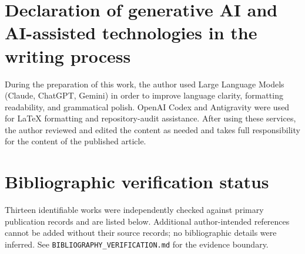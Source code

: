 \documentclass[preprint,12pt]{elsarticle}
\begin{document}
\section*{Declaration of generative AI and AI-assisted technologies in the writing process}\label{declaration-of-generative-ai}

During the preparation of this work, the author used Large Language Models (Claude, ChatGPT, Gemini) in order to improve language clarity, formatting readability, and grammatical polish. OpenAI Codex and Antigravity were used for LaTeX formatting and repository-audit assistance. After using these services, the author reviewed and edited the content as needed and takes full responsibility for the content of the published article.

\section*{Bibliographic verification status}
Thirteen identifiable works were independently checked against primary publication
records and are listed below. Additional author-intended references cannot be
added without their source records; no bibliographic details were inferred. See
\texttt{BIBLIOGRAPHY\_VERIFICATION.md} for the evidence boundary.

\nocite{hassan2023bubbleml,li2021fno,ronneberger2015unet,tran2023ffno,rahman2022uno,hassan2025bubbleformer,zuber1959hydrodynamic,dunlap2026open,ravichandran2021decrypting,ravichandran2023dryareas,kalimuthu2025loglo,richterpowell2022neural,li2026project}


\end{document}

